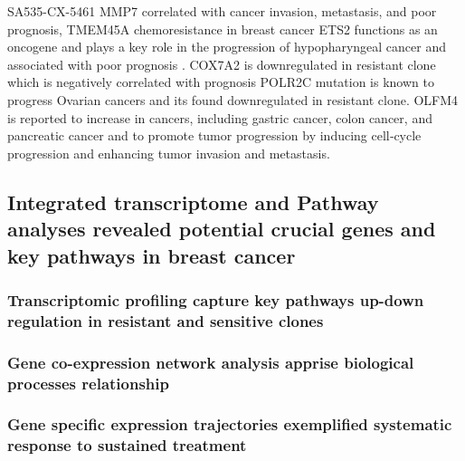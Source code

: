 SA535-CX-5461
MMP7 \cite{mcgowan2008matrix} correlated with cancer invasion, metastasis, and poor prognosis,
TMEM45A \cite{schmit2019characterization} chemoresistance in breast cancer
ETS2 \cite{ge2008role} functions as an oncogene and plays a key role in the progression of hypopharyngeal cancer and associated with poor prognosis \cite{fu2017high}.
COX7A2 \cite{deng2018overexpression} is downregulated in resistant clone which is negatively correlated with prognosis
POLR2C \cite {moriwaki2017polr2c} mutation is known to progress Ovarian cancers and its found downregulated in resistant clone.
OLFM4 \cite{ashizawa2019olfm4} is reported to increase in cancers, including gastric cancer, colon cancer, and pancreatic cancer and to promote tumor progression by inducing cell‐cycle progression and enhancing tumor invasion and metastasis.





\subsection{Integrated transcriptome and Pathway analyses revealed potential crucial genes and key pathways in breast cancer}

\subsubsection{Transcriptomic profiling capture key pathways up-down regulation in resistant and sensitive clones}

\subsubsection{Gene co-expression network analysis apprise biological processes relationship}

\subsubsection{Gene specific expression trajectories exemplified systematic response to sustained treatment}




